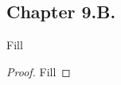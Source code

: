\subsection*{Chapter 9.B. }


\begin{exercise}{1}
  Fill
\end{exercise}
\begin{proof}
 Fill
\end{proof}